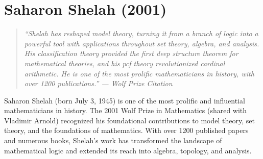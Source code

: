 \let\R\relax
\newcommand{\R}{\mathbb{R}}
\let\C\relax
\newcommand{\C}{\mathbb{C}}
\let\N\relax
\newcommand{\N}{\mathbb{N}}
\let\Z\relax
\newcommand{\Z}{\mathbb{Z}}
\let\Q\relax
\newcommand{\Q}{\mathbb{Q}}
\let\cf\relax
\newcommand{\cf}{\operatorname{cf}}
\let\pp\relax
\newcommand{\pp}{\operatorname{pp}}
\let\tcf\relax
\newcommand{\tcf}{\operatorname{tcf}}
\let\otp\relax
\newcommand{\otp}{\operatorname{otp}}
\let\add\relax
\newcommand{\add}{\operatorname{add}}
\let\dom\relax
\newcommand{\dom}{\operatorname{dom}}
\let\ran\relax
\newcommand{\ran}{\operatorname{ran}}
\let\Hull\relax
\newcommand{\Hull}{\operatorname{Hull}}
\let\Skolem\relax
\newcommand{\Skolem}{\operatorname{Skolem}}
\let\DC\relax
\newcommand{\DC}{\operatorname{DC}}
\let\MA\relax
\newcommand{\MA}{\operatorname{MA}}
\let\CH\relax
\newcommand{\CH}{\operatorname{CH}}
\let\GCH\relax
\newcommand{\GCH}{\operatorname{GCH}}
\let\ZFC\relax
\newcommand{\ZFC}{\operatorname{ZFC}}
\let\ZF\relax
\newcommand{\ZF}{\operatorname{ZF}}
\let\Spec\relax
\newcommand{\Spec}{\operatorname{Spec}}
\let\pcf\relax
\newcommand{\pcf}{\operatorname{pcf}}
\let\Ext\relax
\newcommand{\Ext}{\operatorname{Ext}}

\chapter{Saharon Shelah (2001)}

\begin{quote}
\it ``Shelah has reshaped model theory, turning it from a branch of logic into a powerful tool with applications throughout set theory, algebra, and analysis. His classification theory provided the first deep structure theorem for mathematical theories, and his pcf theory revolutionized cardinal arithmetic. He is one of the most prolific mathematicians in history, with over 1200 publications.'' --- Wolf Prize Citation
\end{quote}

Saharon Shelah (born July 3, 1945) is one of the most prolific and influential mathematicians in history. The 2001 Wolf Prize in Mathematics (shared with Vladimir Arnold) recognized his foundational contributions to model theory, set theory, and the foundations of mathematics. With over 1200 published papers and numerous books, Shelah's work has transformed the landscape of mathematical logic and extended its reach into algebra, topology, and analysis.

